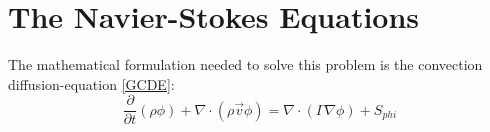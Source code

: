 \chapter{The Navier-Stokes Equations}
The mathematical formulation needed to solve this problem is the convection diffusion-equation \ref{GCDE}:
\begin{equation}
\frac{\partial}{\partial t}\left(\rho\phi\right)+\nabla\cdot\left(\rho\vec{v}\phi\right)=\nabla\cdot\left(\Gamma\nabla\phi\right)+S_{phi}
\label{GCDE}
\end{equation}